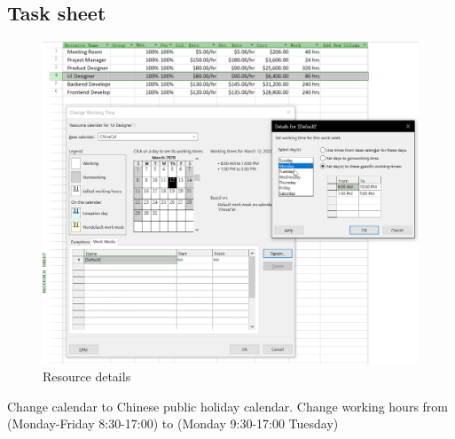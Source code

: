 \documentclass[runningheads]{llncs}
\begin{document}
\subsection{Task sheet}
\begin{figure}[H]
    \centering
    \includegraphics[width=1.0\textwidth]{./image/figure8}
    \caption{Resource details}
    \label{}
\end{figure}
Change calendar to Chinese public holiday calendar.
Change working hours from (Monday-Friday 8:30-17:00) to (Monday 9:30-17:00 Tuesday)
\end{document}
